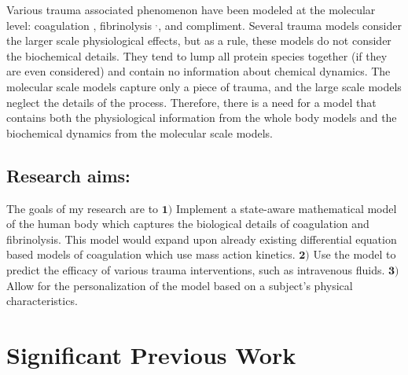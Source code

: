 \documentclass[12pt]{article}
\begin{document}
Various trauma associated phenomenon have been modeled at the molecular level: coagulation \cite{luan2007computationally,beltrami1995mathematical,sagar2015dynamic}, fibrinolysis \cite{bannish2012modelling}$^,$\cite{wootton2002experimental}, and compliment\cite{sagar2016reduced,zewde2016quantitative,korotaevskiy2009non}. Several trauma models consider the larger scale physiological effects, but as a rule, these models do not consider the biochemical details.\cite{ho2005mathematical,hirshberg2003minimizing,simpson1996computer,reisner2013computational}  They tend to lump all protein species together (if they are even considered) and contain no information about chemical dynamics. The molecular scale models capture only a piece of trauma, and the large scale models neglect the details of the process. Therefore, there is a need for a model that contains both the physiological information from the whole body models and the biochemical dynamics from the molecular scale models.  
 
\subsection*{Research aims:} The goals of my research are to 
$\boldsymbol{1)}$  Implement a state-aware mathematical model of the human body which captures the biological details of coagulation and fibrinolysis. This model would expand upon already existing differential equation based models of coagulation which use mass action kinetics.
$\boldsymbol{2)}$ Use the model to predict the efficacy of various trauma interventions, such as intravenous fluids.
$\boldsymbol{3)}$ Allow for the personalization of the model based on a subject's physical characteristics.  
\section*{Significant Previous Work}
\end{document}
